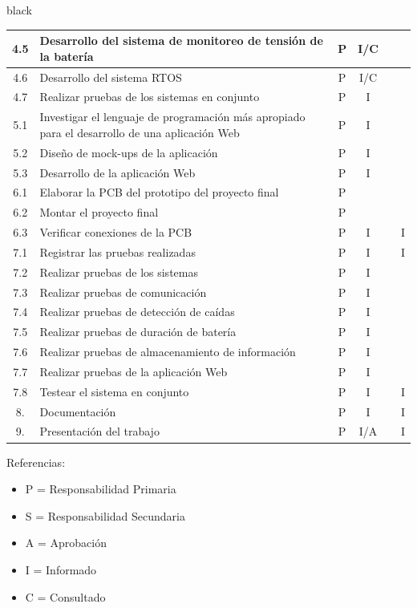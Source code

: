 \documentclass[11pt]{charter}
\begin{document}
\begin{consigna}{black}
\begin{table}[htpb]
{\begin{tabular}{|c|l|c|c|c|c|}
 4.5  & Desarrollo del sistema de monitoreo de tensión de la batería & P & I/C &  & \\ \hline
 4.6  & Desarrollo del sistema RTOS & P & I/C & & \\ \hline
 4.7  & Realizar pruebas de los sistemas en conjunto & P & I & &  \\ \hline
 5.1  & Investigar el lenguaje de programación más apropiado para el desarrollo de una aplicación Web & P & I &  & \\ \hline 
 5.2  & Diseño de mock-ups de la aplicación & P & I & & \\ \hline
 5.3  & Desarrollo de la aplicación Web & P & I & & \\ \hline
 6.1  & Elaborar la PCB del prototipo del proyecto final & P & & &   \\ \hline
 6.2  & Montar el proyecto final & P &  & & \\ \hline
 6.3  & Verificar conexiones de la PCB & P & I & & I \\ \hline
 7.1  & Registrar las pruebas realizadas & P & I & & I \\ \hline
 7.2  & Realizar pruebas de los sistemas & P & I &  &  \\ \hline
 7.3  & Realizar pruebas de comunicación & P & I &  &  \\ \hline
 7.4  & Realizar pruebas de detección de caídas & P & I & &  \\ \hline
 7.5  & Realizar pruebas de duración de batería & P & I & &   \\ \hline 
 7.6  & Realizar pruebas de almacenamiento de información & P & I & &   \\ \hline 
 7.7  & Realizar pruebas de la aplicación Web & P & I & &  \\ \hline 
 7.8  & Testear el sistema en conjunto & P & I & & I \\ \hline 
 8.  & Documentación & P & I & & I \\ \hline
 9.  & Presentación del trabajo & P & I/A & & I \\ \hline 
\end{tabular}%
}
\end{table}

{\footnotesize
Referencias:
\begin{itemize}
	\item P = Responsabilidad Primaria
	\item S = Responsabilidad Secundaria
	\item A = Aprobación
	\item I = Informado
	\item C = Consultado
\end{itemize}
} %
\end{consigna}
\end{document}
